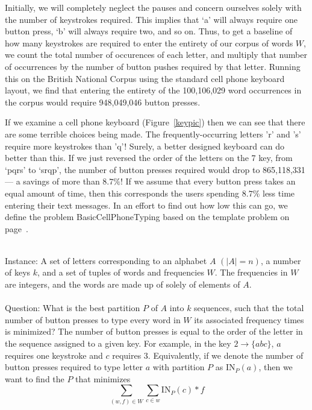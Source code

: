 \documentclass[runningheads]{llncs}
\begin{document}
Initially, we will completely neglect the pauses and concern ourselves solely
with the number of keystrokes required.  This implies that `a' will always
require one button press, `b' will always require two, and so on.  Thus, to get
a baseline of how many keystrokes are required to enter the entirety of our
corpus of words $W$, we count the total number of occurences of each letter,
and multiply that number of occurrences by the number of button pushes
required by that letter.  Running this on the British National Corpus
using the standard cell phone keyboard layout, we find that entering the
entirety of the 100,106,029 word occurrences in the corpus would require
948,049,046 button presses.  

If we examine a cell phone keyboard (Figure~\ref{keypic}) then we can see that
there are some terrible choices being made.  The frequently-occurring letters
'r' and 's' require more keystrokes than 'q'!  Surely, a better designed
keyboard can do better than this.  If we just reversed the order of the letters
on the 7 key, from `pqrs' to `srqp', the number of button presses required
would drop to 865,118,331 --- a savings of more than $8.7\%$!  If we assume
that every button press takes an equal amount of time, then this corresponds
the users spending $8.7\%$ less time entering their text messages.  In an
effort to find out how low this can go, we define the problem {\sc
BasicCellPhoneTyping} based on the template problem on
page~\pageref{probtemplate}.

\begin{prob}[{\sc BasicCellPhoneTyping}]~\\
{\sc Instance}: A set of letters corresponding to an alphabet $A$ $(|A| =
n)$, a number of keys $k$, and a set of
tuples of words and frequencies $W$.  The frequencies in $W$ are integers,
and the words are made up of solely of elements of $A$. \\
        ~\\
{\sc Question}: What is the best partition $P$ of $A$ into $k$ sequences, such
that the total number of button presses to type every word in $W$ its
associated frequency times is minimized?  The number of button presses is equal
to the order of the letter in the sequence assigned to a given key.  For
example, in the key $2\to\{abc\}$, $a$ requires one keystroke and $c$ requires
3.  Equivalently, if we denote the number of button presses required to type
letter $a$ with partition $P$ as $\mathrm{IN}_P(a)$, then we want to find the $P$ that
minimizes $$\sum_{(w,f) \in W}\sum_{c\in w} \mathrm{IN}_P(c) * f$$
\label{bcpt}
\end{prob}
\end{document}

